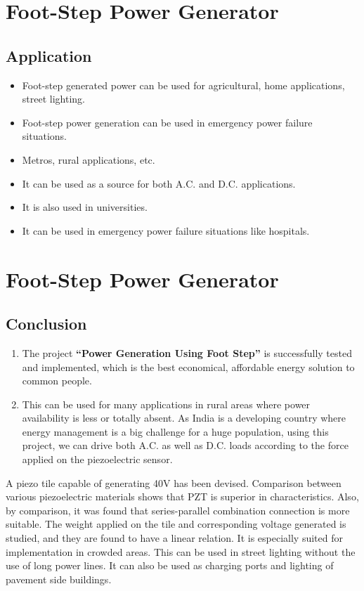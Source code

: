 \documentclass[12pt]{article}
\begin{document}
\section*{Foot-Step Power Generator}

\subsection*{Application}
\begin{itemize}[noitemsep]
    \item Foot-step generated power can be used for agricultural, home applications, street lighting.
    \item Foot-step power generation can be used in emergency power failure situations.
    \item Metros, rural applications, etc.
    \item It can be used as a source for both A.C. and D.C. applications.
    \item It is also used in universities.
    \item It can be used in emergency power failure situations like hospitals.
\end{itemize} 
\newpage
\section*{Foot-Step Power Generator}

\subsection*{Conclusion}
\begin{enumerate}[noitemsep]
    \item The project \textbf{``Power Generation Using Foot Step''} is successfully tested and implemented, which is the best economical, affordable energy solution to common people.
    \item This can be used for many applications in rural areas where power availability is less or totally absent. As India is a developing country where energy management is a big challenge for a huge population, using this project, we can drive both A.C. as well as D.C. loads according to the force applied on the piezoelectric sensor.
\end{enumerate}

A piezo tile capable of generating 40V has been devised. Comparison between various piezoelectric materials shows that PZT is superior in characteristics. Also, by comparison, it was found that series-parallel combination connection is more suitable. The weight applied on the tile and corresponding voltage generated is studied, and they are found to have a linear relation. It is especially suited for implementation in crowded areas. This can be used in street lighting without the use of long power lines. It can also be used as charging ports and lighting of pavement side buildings.
\end{document}
